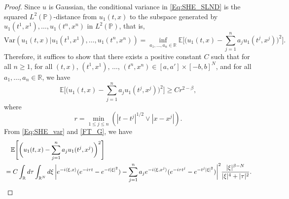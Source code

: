 \documentclass[11pt, reqno]{amsart}
\def\R{{\mathbb R}}
\def\E{{\mathbb E}}
\def\P{{\mathbb P}}
\numberwithin{equation}{section}
\begin{document}
\begin{proof}
Since $u$ is Gaussian, the conditional variance in \eqref{Eq:SHE_SLND} is the squared $L^2(\P)$-distance 
from $u_1(t, x)$ to the subspace generated by 
$u_1(t^1, x^1), \dots, u_1(t^n, x^n)$ in $L^2(\P)$, that is,
\[ \mathrm{Var}\left(u_1(t, x) | u_1(t^1, x^1), \dots, u_1(t^n, x^n)\right) 
= \inf_{a_1, \dots, a_n \in \R} \E\Bigg[ \bigg( u_1(t, x) - \sum_{j=1}^n a_j u_1(t^j, x^j)\bigg)^2 \Bigg]. 
\]
Therefore, it suffices to show that there exists a positive constant $C$ such that for all $n \ge 1$, for all $(t, x)$, $(t^1, x^1)$, $\dots$, $(t^n, x^n) \in [a, a'] \times [-b, b]^N$, 
and for all $a_1, \dots, a_n \in \R$, we have
\[\E\Bigg[ \bigg( u_1(t, x) - \sum_{j=1}^n a_j u_1(t^j, x^j) \bigg)^2 \Bigg] \ge Cr^{2-\beta},\]
where
\[r = \min_{1 \le j \le n}(|t - t^j|^{1/2} \vee |x - x^j|). \]
From \eqref{Eq:SHE_var} and \eqref{FT_G}, we have
\begin{align}
\label{Eq:var_integral}
&\quad \E\Bigg[ \bigg( u_1(t, x) - \sum_{j=1}^n a_j u_1(t^j, x^j) \bigg)^2 \Bigg]\\
& = C \int_{\R} d\tau \int_{\R^N} d\xi \, 
\bigg|e^{-i\langle \xi, x\rangle}(e^{-i\tau t} - e^{-t |\xi|^2}) 
- \sum_{j=1}^n a_j e^{-i\langle \xi, x^j\rangle}(e^{-i\tau t^j} - e^{-t^j |\xi|^2})\bigg|^2 \frac{|\xi|^{\beta-N}}{|\xi|^{4} + |\tau|^2}.\notag
\end{align}


\end{proof}
\end{document}
